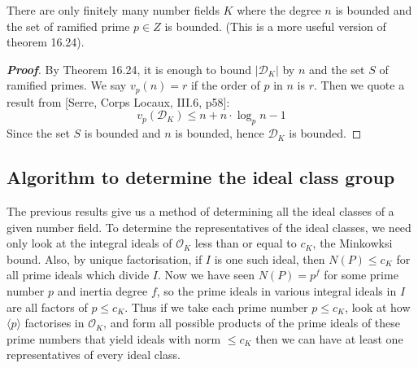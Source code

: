 \begin{theorem} There are only finitely many number fields $K$ where the degree $n$ is bounded and the set of ramified prime $p\in Z$ is bounded. (This is a more useful version of theorem 16.24).
\end{theorem}
\begin{proof}[\bf Proof] By Theorem 16.24, it is enough to bound $|\mathcal{D}_K|$ by $n$ and the set $S$ of ramified primes. We say $v_p(n)=r$ if the order of $p$ in $n$ is $r$.
Then we quote a result from [Serre, Corps Locaux, III.6, p58]:
$$v_p(\mathcal{D}_K)\le n+n\cdot \log_p{n}-1$$
Since the set $S$ is bounded and $n$ is bounded, hence $\mathcal{D}_K$ is bounded.
\end{proof}



\subsection{Algorithm to determine the ideal class group}
The previous results give us a method of determining all the ideal classes of a given number field.
To determine the representatives of the ideal classes, we need only look at the integral ideals of $\mathcal{O}_K$ less than or equal to $c_K$, the Minkowksi bound. Also, by unique factorisation, if $I$ is one such ideal, then
$N(P) \le c_K$ for all prime ideals which divide $I$. Now we have seen $N(P)=p^f$ for some prime number $p$ and inertia degree $f$, so the prime ideals in various integral ideals in $I$ are all factors of $p \le c_K$. Thus if we take each prime number $p \le c_K$, look at how $\langle p \rangle$ factorises in $\mathcal{O}_K$, and form all
possible products of the prime ideals of these prime numbers that yield ideals with norm $\le c_K$ then we can have at least one representatives of every ideal class.


